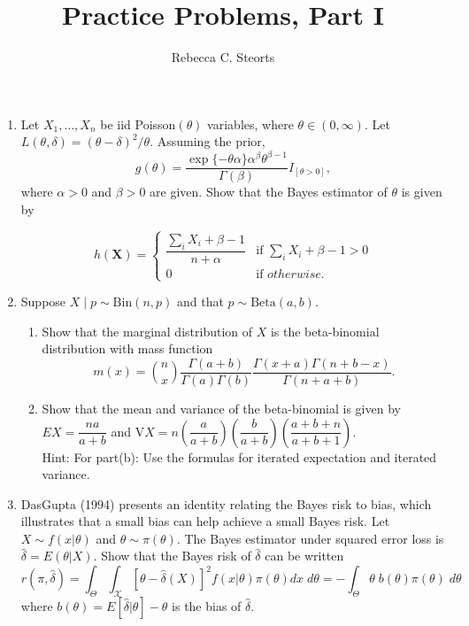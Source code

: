 \documentclass[11pt]{article}
\begin{document}
\title{Practice Problems, Part I}
\author{Rebecca C. Steorts}
\maketitle
\setlength{\parindent}{0cm}
\thispagestyle{empty}
\begin{enumerate}

\item Let $X_1, \ldots, X_n$ be iid Poisson$(\theta)$ variables, where $\theta \in (0,\infty).$ Let 
$L(\theta,\delta) = (\theta - \delta)^2/\theta.$ Assuming the prior,
$$g(\theta) = \frac{\exp\{-
\theta\alpha
\}
\alpha^{\beta}\theta^{\beta-1}
}
{
\Gamma(\beta)
}I_{[\theta > 0]},
$$
where $\alpha>0$ and $\beta>0$ are given. Show that the Bayes estimator of $\theta$ is given by 


$$h(\bm{X}) =
\begin{cases}  \dfrac{\sum_iX_i + \beta - 1}{n + \alpha} &\mbox{if }\sum_iX_i + \beta - 1 > 0 \\
0 & \mbox{if } otherwise. \end{cases} 
$$


\item Suppose $X\mid p \sim \text{Bin}(n,p)$ and that $p \sim \text{Beta}(a,b).$
\begin{enumerate}
\item Show that the marginal distribution of $X$ is the beta-binomial distribution with mass function 
$$m(x) = {n \choose x} \dfrac{\Gamma(a+b)}{\Gamma(a)\Gamma(b)}
\dfrac{\Gamma(x+a)\Gamma(n+b-x)}{\Gamma(n+a+b)}.
$$
\item Show that the mean and variance of the beta-binomial is given by
$EX = \dfrac{na}{a+b}$ and $\text{V}X = n \left(\dfrac{a}{a+b}\right)\left(\dfrac{b}{a+b}\right)\left(\dfrac{a+b+n}{a+b+1}\right).$\\
Hint: For part(b): Use the formulas for iterated expectation and iterated variance. 
\end{enumerate}


\item DasGupta (1994) presents an identity relating the Bayes risk to bias, which illustrates that a small bias can help achieve a small Bayes risk. Let $X \sim f(x|\theta)$ and $\theta \sim \pi(\theta).$ The Bayes estimator under squared error loss is 
$\hat{\delta} = E(\theta|X).$ Show that the Bayes risk of $\hat{\delta}$ can be written 
$$r(\pi,\hat{\delta} ) 
= \int_{\Theta} \int_{\mathcal{X}} 
[\theta - \hat{\delta}(X)]^2 f(x|\theta) \pi(\theta) dx \; d\theta =
- \int_{\Theta} \theta\; b(\theta) \pi(\theta)\; d\theta$$
where $b(\theta) = E[\hat{\delta} | \theta] - \theta$ is the bias of $\hat{\delta} .$



\end{enumerate}
\end{document}
